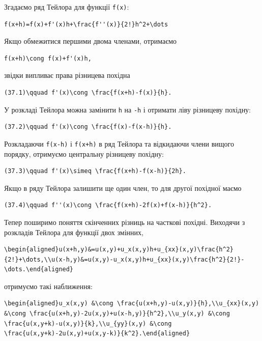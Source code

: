 \documentclass[
  ukrainian,
]{article}
\begin{document}
Згадаємо ряд Тейлора для функції \texttt{f(x)}:

\begin{verbatim}
f(x+h)=f(x)+f'(x)h+\frac{f''(x)}{2!}h^2+\dots
\end{verbatim}

Якщо обмежитися першими двома членами, отримаємо

\begin{verbatim}
f(x+h)\cong f(x)+f'(x)h,
\end{verbatim}

звідки випливає права різницева похідна

\begin{verbatim}
(37.1)\qquad f'(x)\cong \frac{f(x+h)-f(x)}{h}.
\end{verbatim}

У розкладі Тейлора можна замінити \texttt{h} на \texttt{-h} і отримати
ліву різницеву похідну:

\begin{verbatim}
(37.2)\qquad f'(x)\cong \frac{f(x)-f(x-h)}{h}.
\end{verbatim}

Розкладаючи \texttt{f(x-h)} і \texttt{f(x+h)} в ряд Тейлора та
відкидаючи члени вищого порядку, отримуємо центральну різницеву похідну:

\begin{verbatim}
(37.3)\qquad f'(x)\simeq \frac{f(x+h)-f(x-h)}{2h}.
\end{verbatim}

Якщо в ряду Тейлора залишити ще один член, то для другої похідної маємо

\begin{verbatim}
(37.4)\qquad f''(x)\cong \frac{f(x+h)-2f(x)+f(x-h)}{h^2}.
\end{verbatim}

Тепер поширимо поняття скінченних різниць на часткові похідні. Виходячи
з розкладів Тейлора для функції двох змінних,

\begin{verbatim}
\begin{aligned}u(x+h,y)&=u(x,y)+u_x(x,y)h+u_{xx}(x,y)\frac{h^2}{2!}+\dots,\\u(x-h,y)&=u(x,y)-u_x(x,y)h+u_{xx}(x,y)\frac{h^2}{2!}-\dots.\end{aligned}
\end{verbatim}

отримуємо такі наближення:

\begin{verbatim}
\begin{aligned}u_x(x,y) &\cong \frac{u(x+h,y)-u(x,y)}{h},\\u_{xx}(x,y) &\cong \frac{u(x+h,y)-2u(x,y)+u(x-h,y)}{h^2},\\u_y(x,y) &\cong \frac{u(x,y+k)-u(x,y)}{k},\\u_{yy}(x,y) &\cong \frac{u(x,y+k)-2u(x,y)+u(x,y-k)}{k^2}.\end{aligned}
\end{verbatim}
\end{document}
